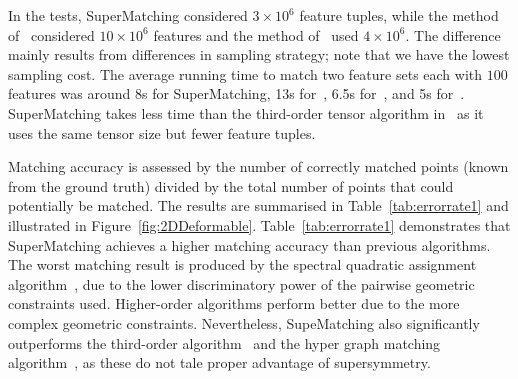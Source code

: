 In the tests, SuperMatching considered $3\times 10^6$ feature tuples, while the method of~\cite{Duchenne09} considered $10\times 10^6$ features  and the method of~\cite{Zass08} used $4\times 10^6$.
The difference  mainly results from differences in sampling strategy; note that we have the lowest  sampling cost.
The average running time to match two feature sets each with $100$ features was around 8s for SuperMatching, 13s for~\cite{Duchenne09}, 6.5s for~\cite{Zass08}, and 5s for~\cite{Cour06}.
SuperMatching takes less  time than the third-order tensor algorithm in~\cite{Duchenne09} as it uses the same tensor size but fewer feature tuples.

Matching accuracy is assessed by the number of correctly matched points (known from the  ground truth) divided by the total number of points that could potentially be matched.
The results are summarised in Table~\ref{tab:errorrate1} and illustrated in Figure~\ref{fig:2DDeformable}.
Table~\ref{tab:errorrate1} demonstrates that SuperMatching achieves a higher matching accuracy than previous algorithms.
The worst matching result is produced by the spectral quadratic assignment algorithm~\cite{Cour06},
due to the lower discriminatory power of the pairwise geometric constraints used.
Higher-order algorithms perform  better due to the more complex geometric constraints.
Nevertheless, SupeMatching also significantly outperforms the third-order algorithm~\cite{Duchenne09} and the hyper graph matching algorithm~\cite{Zass08}, as these do not tale proper advantage of supersymmetry.


